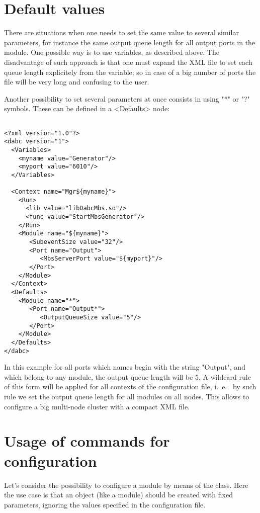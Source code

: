 \section{Default values}
\label{prog_setup_configfile_defaults}
There are situations when one needs to set the same value to several similar parameters,
for instance the same output queue length for all output ports in the module. One possible way is to use variables, as described above. 
The disadvantage of such approach is that one must expand the XML file
to set each queue length explicitely from the variable;
so in case of a big number of ports the file will be very long and 
confusing to the user.

Another possibility to set several parameters at once 
consists in  using "*" or "?" symbols.
These can be defined in a  <Defaults> node: 

\begin{verbatim}

<?xml version="1.0"?>
<dabc version="1">
  <Variables>
    <myname value="Generator"/> 
    <myport value="6010"/> 
  </Variables>

  <Context name="Mgr${myname}">
    <Run>
      <lib value="libDabcMbs.so"/>
      <func value="StartMbsGenerator"/>
    </Run>
    <Module name="${myname}">
       <SubeventSize value="32"/>
       <Port name="Output">
          <MbsServerPort value="${myport}"/>
       </Port>
    </Module>
  </Context>
  <Defaults>
    <Module name="*">
       <Port name="Output*">
          <OutputQueueSize value="5"/>
       </Port>
    </Module>
  </Defaults>
</dabc>

\end{verbatim}

In this example for all ports which names begin with the string "Output", 
and which belong to any module, the output queue length will be 5. 
A wildcard rule of this form will be applied for 
all contexts of the configuration file, 
i.~e.~ by such rule we set the output queue length for all modules on all nodes. 
This allows to configure a big multi-node cluster with
a compact XML file.


\section{Usage of commands for configuration}
\label{prog_setup_configuration_commands}
Let's consider the possibility to configure a module by means of the  class.
Here the use case is that
an object (like a module) should be created with fixed parameters,
ignoring the values specified in the configuration file.

